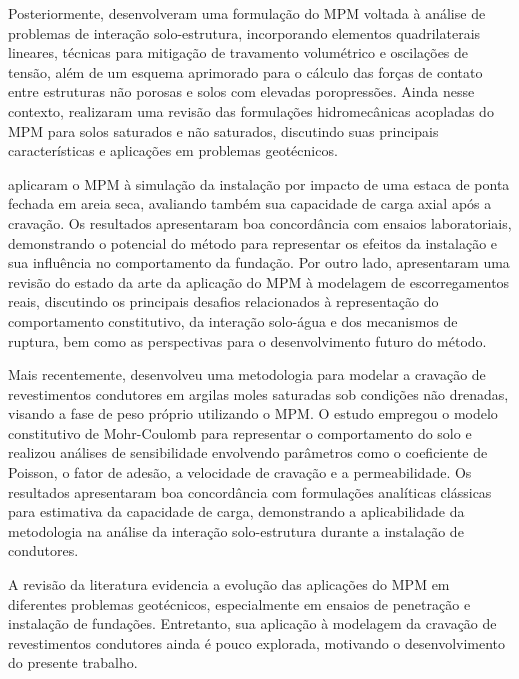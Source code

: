 Posteriormente,  desenvolveram uma formulação do MPM voltada à análise de problemas de interação solo-estrutura, incorporando elementos quadrilaterais lineares, técnicas para mitigação de travamento volumétrico e oscilações de tensão, além de um esquema aprimorado para o cálculo das forças de contato entre estruturas não porosas e solos com elevadas poropressões. Ainda nesse contexto,  realizaram uma revisão das formulações hidromecânicas acopladas do MPM para solos saturados e não saturados, discutindo suas principais características e aplicações em problemas geotécnicos.

 aplicaram o MPM à simulação da instalação por impacto de uma estaca de ponta fechada em areia seca, avaliando também sua capacidade de carga axial após a cravação. Os resultados apresentaram boa concordância com ensaios laboratoriais, demonstrando o potencial do método para representar os efeitos da instalação e sua influência no comportamento da fundação. Por outro lado,  apresentaram uma revisão do estado da arte da aplicação do MPM à modelagem de escorregamentos reais, discutindo os principais desafios relacionados à representação do comportamento constitutivo, da interação solo-água e dos mecanismos de ruptura, bem como as perspectivas para o desenvolvimento futuro do método.

Mais recentemente,  desenvolveu uma metodologia para modelar a cravação de revestimentos condutores em argilas moles saturadas sob condições não drenadas, visando a fase de peso próprio utilizando o MPM. O estudo empregou o modelo constitutivo de Mohr-Coulomb para representar o comportamento do solo e realizou análises de sensibilidade envolvendo parâmetros como o coeficiente de Poisson, o fator de adesão, a velocidade de cravação e a permeabilidade. Os resultados apresentaram boa concordância com formulações analíticas clássicas para estimativa da capacidade de carga, demonstrando a aplicabilidade da metodologia na análise da interação solo-estrutura durante a instalação de condutores. 

A revisão da literatura evidencia a evolução das aplicações do MPM em diferentes problemas geotécnicos, especialmente em ensaios de penetração e instalação de fundações. Entretanto, sua aplicação à modelagem da cravação de revestimentos condutores ainda é pouco explorada, motivando o desenvolvimento do presente trabalho.